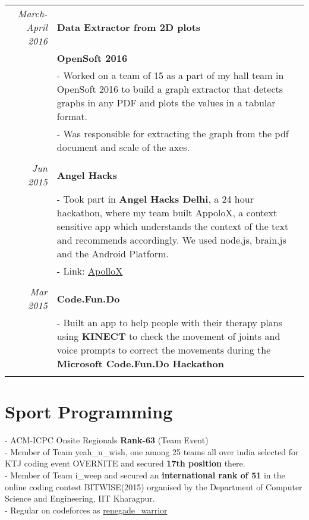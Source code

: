 \documentclass[a4paper,10pt]{article} %
\begin{document}
\begin{tabular}{r|p{15cm}}


\emph{March-April 2016} & \textbf{Data Extractor from 2D plots} \\
& \textbf{OpenSoft 2016}\\
& \footnotesize{- Worked on a team of 15 as a part of my hall team in OpenSoft 2016 to build a graph extractor that detects graphs in any PDF and plots the values in a tabular format.}\\
& \footnotesize{- Was responsible for extracting the graph from the pdf document and scale of the axes.}\\
\multicolumn{2}{c}{} \\

\emph{Jun 2015} & \textbf{Angel Hacks} \\
& \footnotesize{- Took part in \textbf{Angel Hacks Delhi}, a 24 hour hackathon, where my team built AppoloX, a context sensitive app which understands the context of the text and recommends accordingly. We used node.js, brain.js and the Android Platform. }\\
& \footnotesize{- Link: \href{http://52.11.170.180:8080/}{ApolloX}}\\
\multicolumn{2}{c}{} \\

\emph{Mar 2015} & \textbf{Code.Fun.Do} \\
& \footnotesize{- Built an app to help people with their therapy plans using \textbf{KINECT} to check the movement of joints and voice prompts to correct the movements during the \textbf{Microsoft Code.Fun.Do Hackathon}}\\
\multicolumn{2}{c}{} \\
\end{tabular}


\section{Sport Programming}

- ACM-ICPC Onsite Regionals \textbf{Rank-63} (Team Event)\\
- Member of Team yeah\_u\_wish, one among 25 teams all over india selected for KTJ coding event OVERNITE and secured \textbf{17th position} there.\\
- Member of Team i\_weep and secured an \textbf{international rank of 51} in the online coding contest BITWISE(2015) organised by the Department of Computer Science and Engineering, IIT Kharagpur.\\
- Regular on codeforces as {\href{http://codeforces.com/profile/renegade_warrior}{renegade\_warrior}}\\
\end{document}
